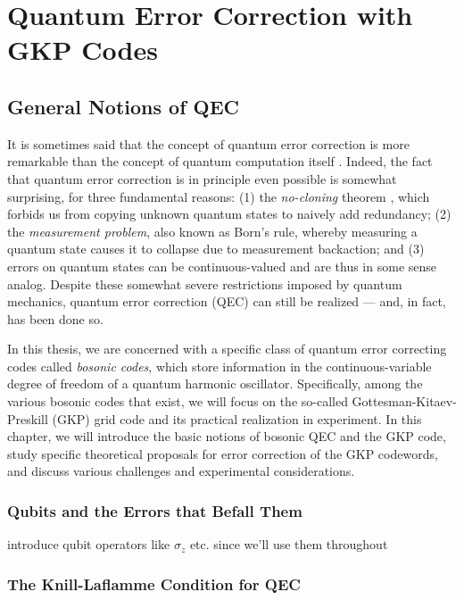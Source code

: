 \chapter{Quantum Error Correction with GKP Codes\label{ch:2_QEC}}

\section{General Notions of QEC}
It is sometimes said that the concept of quantum error correction is more remarkable than the concept of quantum computation itself \cite{girvin2019QECvideo}. Indeed, the fact that quantum error correction is in principle even possible is somewhat surprising, for three fundamental reasons: (1) the \textit{no-cloning} theorem \cite{ike-and-mike}, which forbids us from copying unknown quantum states to naively add redundancy; (2) the \textit{measurement problem}, also known as Born's rule, whereby measuring a quantum state causes it to collapse due to measurement backaction; and (3) errors on quantum states can be continuous-valued and are thus in some sense analog. Despite these somewhat severe restrictions imposed by quantum mechanics, quantum error correction (QEC) can still be realized --- and, in fact, has been done so.


In this thesis, we are concerned with a specific class of quantum error correcting codes called \textit{bosonic codes}, which store information in the continuous-variable degree of freedom of a quantum harmonic oscillator. Specifically, among the various bosonic codes that exist, we will focus on the so-called Gottesman-Kitaev-Preskill (GKP) grid code and its practical realization in experiment. In this chapter, we will introduce the basic notions of bosonic QEC and the GKP code, study specific theoretical proposals for error correction of the GKP codewords, and discuss various challenges and experimental considerations.


\subsection{Qubits and the Errors that Befall Them}






introduce qubit operators like $\sigma_z$ etc. since we'll use them throughout


\subsection{The Knill-Laflamme Condition for QEC}


